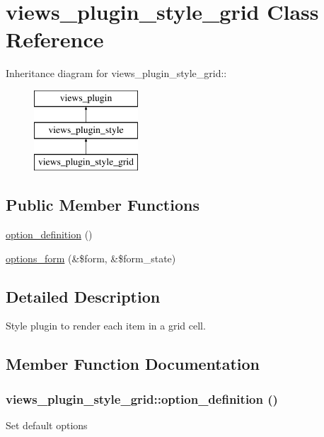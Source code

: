 \hypertarget{classviews__plugin__style__grid}{
\section{views\_\-plugin\_\-style\_\-grid Class Reference}
\label{classviews__plugin__style__grid}
}
Inheritance diagram for views\_\-plugin\_\-style\_\-grid::\begin{figure}[H]
\begin{center}
\leavevmode
\includegraphics[height=3cm]{classviews__plugin__style__grid}
\end{center}
\end{figure}
\subsection*{Public Member Functions}
\begin{DoxyCompactItemize}
\item 
\hyperlink{classviews__plugin__style__grid_af20dafba4e79fdb15ff8553d2733552b}{option\_\-definition} ()
\item 
\hyperlink{classviews__plugin__style__grid_a275eb0e00406028e000268ae389d17a3}{options\_\-form} (\&\$form, \&\$form\_\-state)
\end{DoxyCompactItemize}


\subsection{Detailed Description}
Style plugin to render each item in a grid cell. 

\subsection{Member Function Documentation}
\hypertarget{classviews__plugin__style__grid_af20dafba4e79fdb15ff8553d2733552b}{
\subsubsection[{option\_\-definition}]{\setlength{\rightskip}{0pt plus 5cm}views\_\-plugin\_\-style\_\-grid::option\_\-definition ()}}
\label{classviews__plugin__style__grid_af20dafba4e79fdb15ff8553d2733552b}
Set default options 

